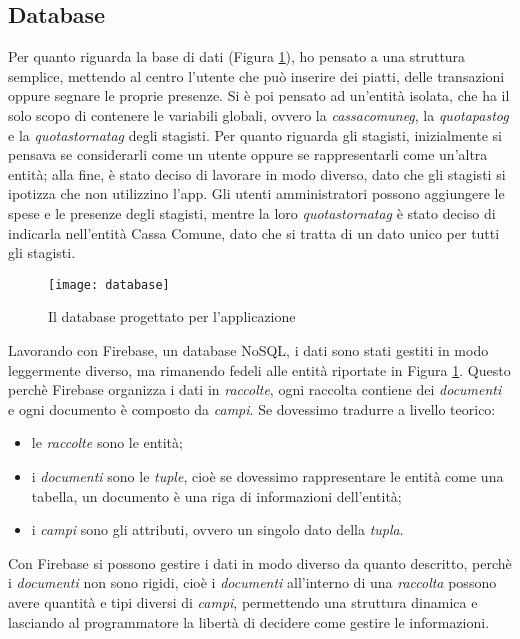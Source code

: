 \subsection{Database}
Per quanto riguarda la base di dati (Figura \ref{fig:database}), ho pensato a una struttura semplice, mettendo al centro l'utente che può inserire dei piatti, delle transazioni oppure segnare le proprie presenze.\newline
Si è poi pensato ad un'entità isolata, che ha il solo scopo di contenere le variabili globali, ovvero la \emph{\gls{cassacomuneg}}, la \emph{\gls{quotapastog}} e la \emph{\gls{quotastornatag}} degli stagisti.\newline
Per quanto riguarda gli stagisti, inizialmente si pensava se considerarli come un utente oppure se rappresentarli come un'altra entità; alla fine, è stato deciso di lavorare in modo diverso, dato che gli stagisti si ipotizza che non utilizzino l'app.\newline
Gli utenti amministratori possono aggiungere le spese e le presenze degli stagisti, mentre la loro \emph{\gls{quotastornatag}} è stato deciso di indicarla nell'entità Cassa Comune, dato che si tratta di un dato unico per tutti gli stagisti.\newline
\begin{figure}[!h] 
    \centering 
    \texttt{[image: database]} 
    \caption{Il database progettato per l'applicazione}
    \label{fig:database}
\end{figure}
\newline
Lavorando con Firebase, un database NoSQL, i dati sono stati gestiti in modo leggermente diverso, ma rimanendo fedeli alle entità riportate in Figura \ref{fig:database}.\newline
Questo perchè Firebase organizza i dati in \emph{raccolte}, ogni raccolta contiene dei \emph{documenti} e ogni documento è composto da \emph{campi}.\newline
Se dovessimo tradurre a livello teorico:
\begin{itemize}
    \item le \emph{raccolte} sono le entità;
    \item i \emph{documenti} sono le \emph{tuple}, cioè se dovessimo rappresentare le entità come una tabella, un documento è una riga di informazioni dell'entità;
    \item i \emph{campi} sono gli attributi, ovvero un singolo dato della \emph{tupla}.
\end{itemize}
Con Firebase si possono gestire i dati in modo diverso da quanto descritto, perchè i \emph{documenti} non sono rigidi, cioè i \emph{documenti} all'interno di una \emph{raccolta} possono avere quantità e tipi diversi di \emph{campi}, permettendo una struttura dinamica e lasciando al programmatore la libertà di decidere come gestire le informazioni.\newline
